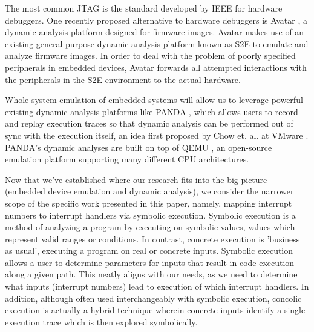 \documentclass[letterpaper, 10 pt, conference]{ieeeconf}
\begin{document}
The most common JTAG \cite{jtag} is the standard developed by IEEE for hardware debuggers. One recently proposed alternative to hardware debuggers is Avatar \cite{avatar}, a dynamic analysis platform designed for firmware images. Avatar makes use of an existing general-purpose dynamic analysis platform known as S2E \cite{s2e} to emulate and analyze firmware images. In order to deal with the problem of poorly specified peripherals in embedded devices, Avatar forwards all attempted interactions with the peripherals in the S2E environment to the actual hardware. 

Whole system emulation of embedded systems will allow us to leverage powerful existing dynamic analysis platforms like PANDA \cite{panda}, which allows users to record and replay execution traces so that dynamic analysis can be performed out of sync with the execution itself, an idea first proposed by Chow et. al. at VMware \cite{jchow}. PANDA's dynamic analyses are built on top of QEMU \cite{qemu}, an open-source emulation platform supporting many different CPU architectures. 

Now that we've established where our research fits into the big picture (embedded device emulation and dynamic analysis), we consider the narrower scope of the specific work presented in this paper, namely, mapping interrupt numbers to interrupt handlers via symbolic execution. Symbolic execution \cite{jking} is a method of analyzing a program by executing on symbolic values, values which represent valid ranges or conditions. In contrast, concrete execution is 'business as usual', executing a program on real or concrete inputs. Symbolic execution allows a user to determine parameters for inputs that result in code execution along a given path. This neatly aligns with our needs, as we need to determine what inputs (interrupt numbers) lead to execution of which interrupt handlers. In addition, although often used interchangeably with symbolic execution, concolic execution \cite{ksen} is actually a hybrid technique wherein concrete inputs identify a single execution trace which is then explored symbolically. 
\end{document}
